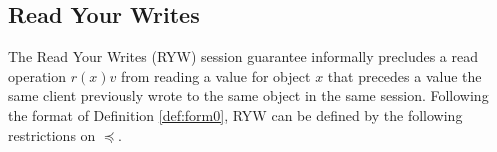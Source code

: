 \documentclass[journal, compsoc]{IEEEtran}
\begin{document}
	\subsection{Read Your Writes}
	
	The Read Your Writes (RYW) session guarantee informally precludes a read operation $r(x)v$  from reading a value for object $x$ that precedes a value the same client previously wrote to the same object in the same session.
	Following the format of Definition \ref{def:form0}, RYW can be defined by the following restrictions on $\preccurlyeq$.
	
\end{document}
